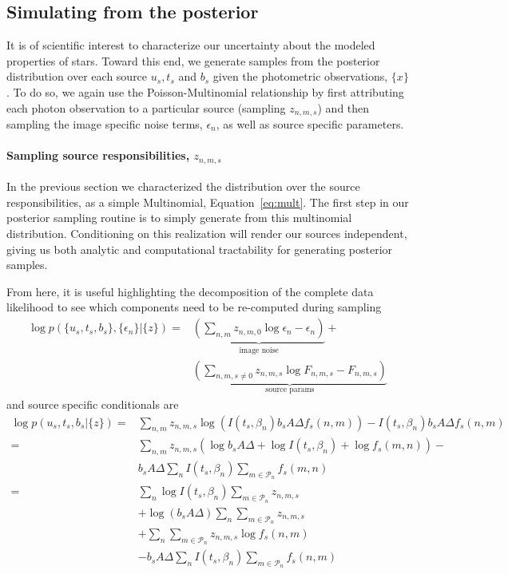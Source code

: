 \documentclass[11pt]{article}
\begin{document}
\subsection{Simulating from the posterior}
It is of scientific interest to characterize our uncertainty about the modeled properties of stars.  Toward this end, we generate samples from the posterior distribution over each source $u_s, t_s$ and $b_s$ given the photometric observations, $\{ x \}$.  To do so, we again use the Poisson-Multinomial relationship by first attributing each photon observation to a particular source (sampling $z_{n,m,s}$) and then sampling the image specific noise terms, $\epsilon_n$, as well as source specific parameters.  

\paragraph{Sampling source responsibilities, $z_{n,m,s}$}
In the previous section we characterized the distribution over the source responsibilities, as a simple Multinomial, Equation~\ref{eq:mult}. The first step in our posterior sampling routine is to simply generate from this multinomial distribution. Conditioning on this realization will render our sources independent, giving us both analytic and computational tractability for generating posterior samples.  

From here, it is useful highlighting the decomposition of the complete data likelihood to see which components need to be re-computed during sampling 
\begin{align}
  \log p( \{u_s, t_s, b_s\}, \{ \epsilon_n\} | \{ z \})
  =& \underbrace{\left( \sum_{n,m} z_{n,m,0} \log \epsilon_n - \epsilon_n \right)}_{\text{image noise}} + \\
     & \underbrace{\left(\sum_{n,m,s\neq 0} z_{n,m,s} \log F_{n,m,s} - F_{n,m,s}\right)}_{\text{source params}} 
\end{align}
and source specific conditionals are
\begin{align}
\log p(u_s, t_s, b_s | \{z\}) 
  =& \sum_{n,m} z_{n,m,s} \log\left(I(t_s,\beta_n) b_s A \Delta f_s(n,m) \right) - I(t_s,\beta_n) b_s A \Delta f_s(n,m)\\
  =& \sum_{n,m} z_{n,m,s} \left(\log b_s A \Delta + \log I(t_s, \beta_n) + \log f_s(m,n) \right) - \\
   & b_s A \Delta \sum_{n} I(t_s, \beta_n) \sum_{m \in \mathcal{P}_n} f_s(m,n) \\
  =& \sum_{n} \log I(t_s, \beta_n) \sum_{m \in \mathcal{P}_n} z_{n,m,s} \\
   & + \log (b_s A \Delta) \sum_{n} \sum_{m \in \mathcal{P}_n} z_{n,m,s} \\
   & + \sum_{n} \sum_{m \in \mathcal{P}_n} z_{n,m,s} \log f_s(n,m) \\
   & - b_s A \Delta \sum_{n} I(t_s, \beta_n) \sum_{m \in \mathcal{P}_n} f_s(n,m)
\end{align}
\end{document}
